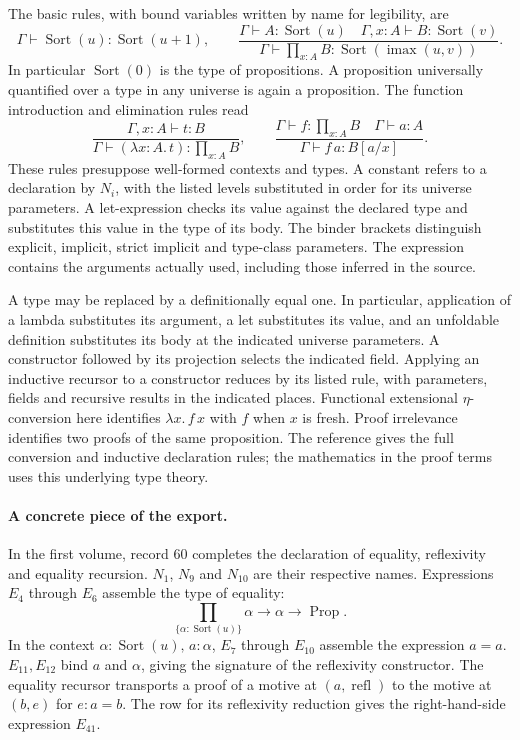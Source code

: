 The basic rules, with bound variables written by name for legibility, are
\[
 \Gamma\vdash\operatorname{Sort}(u):\operatorname{Sort}(u+1),
 \qquad
 \frac{\Gamma\vdash A:\operatorname{Sort}(u)
       \quad\Gamma,x:A\vdash B:\operatorname{Sort}(v)}
      {\Gamma\vdash\prod_{x:A}B:\operatorname{Sort}(\operatorname{imax}(u,v))}.
\]
In particular \(\operatorname{Sort}(0)\) is the type of propositions.
A proposition universally quantified over a type in any universe is
again a proposition. The function introduction and elimination rules
read
\[
 \frac{\Gamma,x:A\vdash t:B}{\Gamma\vdash(\lambda x:A.\,t):\prod_{x:A}B},
 \qquad
 \frac{\Gamma\vdash f:\prod_{x:A}B\quad\Gamma\vdash a:A}
      {\Gamma\vdash f\,a:B[a/x]} .
\]
These rules presuppose well-formed contexts and types. A constant refers
to a declaration by \(N_i\), with the listed levels substituted in order
for its universe parameters. A let-expression checks its value against
the declared type and substitutes this value in the type of its body.
The binder brackets distinguish explicit, implicit, strict implicit and
type-class parameters. The expression contains the arguments actually
used, including those inferred in the source.

A type may be replaced by a definitionally equal one. In particular,
application of a lambda substitutes its argument, a let substitutes
its value, and an unfoldable definition substitutes its body at the
indicated universe parameters. A constructor followed by its projection
selects the indicated field. Applying an inductive recursor to a
constructor reduces by its listed rule, with parameters, fields and
recursive results in the indicated places. Functional extensional
\(\eta\)-conversion here identifies \(\lambda x.\,f\,x\) with \(f\)
when \(x\) is fresh. Proof irrelevance identifies two proofs of the
same proposition. The reference gives the full conversion and inductive
declaration rules; the mathematics in the proof terms uses this
underlying type theory.

\paragraph{A concrete piece of the export.}
In the first volume, record 60 completes the declaration of equality,
reflexivity and equality recursion. \(N_1\), \(N_9\) and \(N_{10}\)
are their respective names. Expressions \(E_4\) through \(E_6\)
assemble the type of equality:
\[
 \prod_{\{\alpha:\operatorname{Sort}(u)\}}\alpha\longrightarrow
       \alpha\longrightarrow\operatorname{Prop}.
\]
In the context \(\alpha:\operatorname{Sort}(u),\,a:\alpha\), \(E_7\) through \(E_{10}\)
assemble the expression \(a=a\).
\(E_{11},E_{12}\) bind \(a\) and \(\alpha\), giving the signature of
the reflexivity constructor. The equality recursor transports a proof of
a motive at \((a,\operatorname{refl})\) to the motive at
\((b,e)\) for \(e:a=b\). The row for its reflexivity reduction gives
the right-hand-side expression \(E_{41}\).

